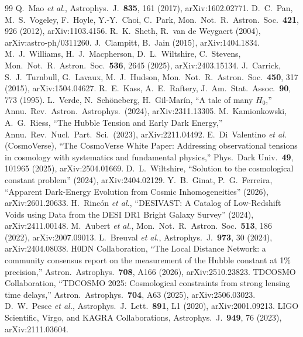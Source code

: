 \documentclass[aps,prd,twocolumn,nofootinbib,superscriptaddress,floatfix]{revtex4-2}
\begin{document}
\begin{thebibliography}{99}
 Q.~Mao \emph{et al.}, Astrophys.\ J.\ \textbf{835}, 161 (2017), arXiv:1602.02771.
 D.~C.~Pan, M.~S.~Vogeley, F.~Hoyle, Y.-Y.~Choi, C.~Park, Mon.\ Not.\ R.\ Astron.\ Soc.\ \textbf{421}, 926 (2012), arXiv:1103.4156.
 R.~K.~Sheth, R.~van de Weygaert (2004), arXiv:astro-ph/0311260.
 J.~Clampitt, B.~Jain (2015), arXiv:1404.1834.
 M.~J.~Williams, H.~J.~Macpherson, D.~L.~Wiltshire, C.~Stevens, Mon.\ Not.\ R.\ Astron.\ Soc.\ \textbf{536}, 2645 (2025), arXiv:2403.15134.
 J.~Carrick, S.~J.~Turnbull, G.~Lavaux, M.~J.~Hudson, Mon.\ Not.\ R.\ Astron.\ Soc.\ \textbf{450}, 317 (2015), arXiv:1504.04627.
 R.~E.~Kass, A.~E.~Raftery, J.\ Am.\ Stat.\ Assoc.\ \textbf{90}, 773 (1995).
 L.~Verde, N.~Sch\"oneberg, H.~Gil-Mar\'in, ``A tale of many $H_0$,'' Annu.\ Rev.\ Astron.\ Astrophys.\ (2024), arXiv:2311.13305.
 M.~Kamionkowski, A.~G.~Riess, ``The Hubble Tension and Early Dark Energy,'' Annu.\ Rev.\ Nucl.\ Part.\ Sci.\ (2023), arXiv:2211.04492.
 E.~Di~Valentino \emph{et al.} (CosmoVerse), ``The CosmoVerse White Paper: Addressing observational tensions in cosmology with systematics and fundamental physics,'' Phys.\ Dark Univ.\ \textbf{49}, 101965 (2025), arXiv:2504.01669.
 D.~L.~Wiltshire, ``Solution to the cosmological constant problem'' (2024), arXiv:2404.02129.
 Y.~B.~Ginat, P.~G.~Ferreira, ``Apparent Dark-Energy Evolution from Cosmic Inhomogeneities'' (2026), arXiv:2601.20633.
 H.~Rinc\'on \emph{et al.}, ``DESIVAST: A Catalog of Low-Redshift Voids using Data from the DESI DR1 Bright Galaxy Survey'' (2024), arXiv:2411.00148.
 M.~Aubert \emph{et al.}, Mon.\ Not.\ R.\ Astron.\ Soc.\ \textbf{513}, 186 (2022), arXiv:2007.09013.
 L.~Breuval \emph{et al.}, Astrophys.\ J.\ \textbf{973}, 30 (2024), arXiv:2404.08038.
 H0DN Collaboration, ``The Local Distance Network: a community consensus report on the measurement of the Hubble constant at 1\% precision,'' Astron.\ Astrophys.\ \textbf{708}, A166 (2026), arXiv:2510.23823.
 TDCOSMO Collaboration, ``TDCOSMO 2025: Cosmological constraints from strong lensing time delays,'' Astron.\ Astrophys.\ \textbf{704}, A63 (2025), arXiv:2506.03023.
 D.~W.~Pesce \emph{et al.}, Astrophys.\ J.\ Lett.\ \textbf{891}, L1 (2020), arXiv:2001.09213.
 LIGO Scientific, Virgo, and KAGRA Collaborations, Astrophys.\ J.\ \textbf{949}, 76 (2023), arXiv:2111.03604.
\end{thebibliography}
\end{document}
